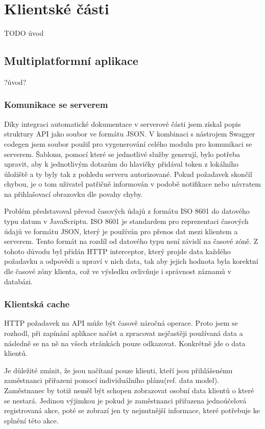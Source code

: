 \documentclass[
  biblatex,
  glossaries,
  index
]{kidiplom}
\begin{document}
\newpage

\section{Klientské části}
TODO úvod

\subsection{Multiplatformní aplikace}
?úvod?

\subsubsection{Komunikace se serverem}
Díky integraci automatické dokumentace v serverové části jsem získal popis struktury API jako soubor ve formátu JSON. V kombinaci s nástrojem Swagger codegen jsem soubor použil pro vygenerování celého modulu pro komunikaci se serverem. Šablonu, pomocí které se jednotlivé služby generují, bylo potřeba upravit, aby k jednotlivým dotazům do hlavičky přidával token z lokálního úložiště a ty byly tak z pohledu serveru autorizované. Pokud požadavek skončil chybou, je o tom uživatel patřičně informován v podobě notifikace nebo návratem na přihlašovací obrazovku dle povahy chyby.

Problém představoval převod časových údajů z formátu ISO 8601 do datového typu datum v JavaScriptu. ISO 8601 je standardem pro reprezentaci časových údajů ve formátu JSON, který je používán pro přenos dat mezi klientem a serverem. Tento formát na rozdíl od datového typu není závislí na časové zóně. Z tohoto důvodu byl přidán HTTP interceptor, který projde data každého požadavku a odpovědi a upraví v nich data, tak aby jejich hodnota byla korektní dle časové zóny klienta, což ve výsledku ovlivňuje i správnost záznamů v databázi.

\subsubsection{Klientská cache}
HTTP požadavek na API může být časově náročná operace. Proto jsem se rozhodl, při zapínání aplikace načíst a zpracovat nejčastěji používaná data a následně se na ně na všech stránkách pouze odkazovat. Konkrétně jde o data klientů. 

Je důležité zmínit, že jsou načítaní pouze klienti, kteří jsou přihlášenému zaměstnanci přiřazeni pomocí individuálního plánu(ref. data model). Zaměstnanec by totiž neměl být schopen zobrazovat osobní data klientů o které se nestará. Jedinou výjimkou je pokud je zaměstnanci přiřazena jednoúčelová registrovaná akce, poté se zobrazí jen ty nejnutnější informace, které potřebuje ke splnění této akce.
\end{document}
